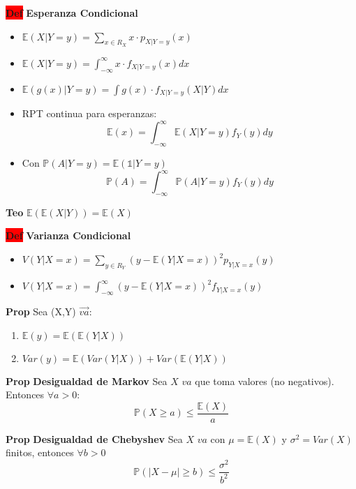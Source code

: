 \documentclass[letterpaper,10.5pt,twocolumn]{article} %
\newcommand{\E}{\mathbb{E} }
\newcommand{\Proba}{\mathbb{P} }
\newcommand{\hlc}[2][yellow]{ \colorbox{#1}{#2} }
\newcommand{\Prop}{\hlc[amber]{\bfseries Prop}}
\newcommand{\Def}{\hlc[red]{\bfseries Def}}
\newcommand{\Teo}{\hlc[applegreen]{\bfseries Teo}}
\begin{document}
\Def \textbf{Esperanza Condicional}
\begin{itemize}
    \item $\E(X|Y=y) = \sum\limits_{x\in R_X} x\cdot p_{X|Y=y} (x) $
    \item $\E(X|Y=y) = \int_{-\infty}^{\infty} x\cdot f_{X|Y=y} (x) dx $
    \item $\E(g(x)|Y=y) = \int g(x) \cdot f_{X|Y=y} (X|Y) dx $
    \item RPT continua para esperanzas:
    \begin{equation*}
        \E(x)= \int_{-\infty}^{\infty} \E (X|Y=y) f_Y (y) dy
    \end{equation*}
    \item Con $\Proba(A|Y=y) = \E (\mathds{1} | Y=y) $
    \begin{equation*}
        \Proba(A)= \int_{-\infty}^{\infty} \Proba (A|Y=y) f_Y (y) dy
    \end{equation*}
\end{itemize}

\Teo $\E(\E (X|Y)) = \E(X)$

\Def \textbf{Varianza Condicional}
\begin{itemize}
    \item $V(Y|X=x)=\sum\limits_{y\in R_Y} (y - \E(Y|X=x))^2 p_{Y|X=x} (y)$
    \item $V(Y|X=x)=\int_{-\infty}^{\infty} (y - \E(Y|X=x))^2 f_{Y|X=x}(y)$
\end{itemize}

\Prop Sea (X,Y) $\vec{va}$:
\begin{enumerate}[label={(\textit{\alph*})}, leftmargin=*, itemsep=0pt]
    \item $\E(y) = \E(\E(Y|X))$
    \item $ Var (y) = \E(Var (Y |X)) + Var (\E(Y |X))$
\end{enumerate}

\Prop \textbf{Desigualdad de Markov} Sea $X$ $va$ que toma valores (no negativos). Entonces $\forall a>0 $:
\begin{equation*}
    \Proba(X\geq a) \leq \dfrac{\E(X)}{a}
\end{equation*}

\Prop \textbf{Desigualdad de Chebyshev} Sea $X$ $va$ con $\mu = \E (X) $ y $\sigma^2 = Var(X)$ finitos, entonces $\forall b >0$
\begin{equation*}
    \Proba (|X-\mu |\geq b) \leq \dfrac{\sigma^2}{b^2}
\end{equation*}
\end{document}
